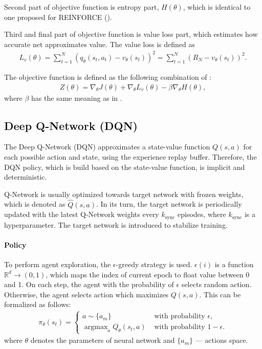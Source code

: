 \documentclass{article}
\begin{document}
Second part of objective function is entropy part, $H(\theta)$, which is
identical to one proposed for REINFORCE ().

Third and final part of objective function is value loss part, which estimates
how accurate net approximates value. The value loss is defined as
\begin{align}
  \label{eq:a2c_vl}
  L_v(\theta)
  =\sum^N_{t=1} {(q_{\theta}(s_t, a_t) - v_{\theta}(s_t))}^2
  = \sum^N_{t=1} {(R_N- v_\theta(s_t))}^2.
\end{align}

The objective function is defined as the following combination of
:
\begin{align}
  \label{eq:a2c_objective}
  Z(\theta) = \nabla_\theta J(\theta) +
  \nabla_\theta L_v(\theta) - \beta \nabla_\theta H(\theta),
\end{align}
where $\beta$ has the same meaning as in .


\subsection{Deep Q-Network (DQN)}\label{subsubsec:dqn}

The Deep Q-Network (DQN) approximates a state-value function $Q(s, a)$ for each
possible action and state, using the experience replay buffer. Therefore, the
DQN policy, which is build based on the state-value function, is implicit and
deterministic.

Q-Network is usually optimized towards target network with frozen weights,
which is denoted as $\hat{Q}(s, a)$. In its turn, the target network is
periodically updated with the latest Q-Network weights every $k_\text{sync}$
episodes, where $k_\text{sync}$ is a hyperparameter. The target network is
introduced to stabilize training.

\paragraph{Policy}
To perform agent exploration, the $\epsilon$-greedy strategy is used.
$\epsilon(i)$ is a function $\mathbb{R}^d \rightarrow (0, 1)$, which maps the
index of current epoch to float value between 0 and 1. On each step, the agent
with the probability of $\epsilon$ selects random action. Otherwise, the agent
selects action which maximizes $Q(s, a)$. This can be formalized as follows:
\begin{align}
  \label{eq:dqn_policy}
  \pi_{\theta}(s_t) =
  \begin{cases}
    a \sim \{a_m\}                          & \text{ with probability } \epsilon,     \\
    \operatorname{argmax}_a Q_\theta(s_t,a) & \text{ with probability } 1 - \epsilon.
  \end{cases}
\end{align}
where $\theta$
denotes the parameters of neural network and
$\{a_m\}$ --- actions space.
\end{document}
